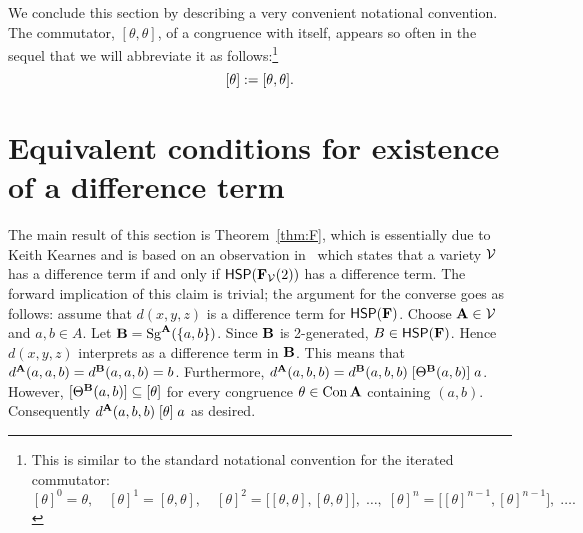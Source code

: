 We conclude this section by describing a very convenient notational convention.
The commutator, $[\theta, \theta]$, of a congruence with
itself, appears so often in the sequel that we will abbreviate it as
follows:\footnote{This is similar to the standard notational convention
  for the iterated commutator:
  \[
    [\theta]^0 =  \theta, \quad
    [\theta]^1 =  [\theta, \theta],  \quad
    [\theta]^2 =  \bigl[[\theta, \theta],[\theta, \theta]\bigr],  \; \dots, \;
    [\theta]^n =  \bigl[[\theta]^{n-1}, [\theta]^{n-1}\bigr], \; \dots.
    \]
}
\[
[\theta]:= [\theta, \theta].
\]



\section{Equivalent conditions for existence of a difference term}
\label{sec:equiv-cond-exist}
The main result of this section is Theorem~\ref{thm:F}, which 
is essentially due to Keith Kearnes and is based on an observation
in~\cite{MR1358491}
which states that a variety $\mathcal{V}$ has a difference term if and only if
$\mathsf{H} \mathsf{S} \mathsf{P}(\mathbf{F}_{\mathcal{V}}(2))$ 
has a difference term.
The forward implication of this claim is trivial;
the argument for the converse goes as follows:
assume that $d(x, y, z)$ is a difference term for $\mathsf{H} \mathsf{S} \mathsf{P}(\mathbf{F})$.
Choose $\mathbf{A} \in \mathcal{V}$ and $a, b \in A$. Let $\mathbf{B} = \operatorname{Sg}^{\mathbf{A}} (\{a, b\})$.
Since $\mathbf{B}$ is 2-generated, $B \in \mathsf{H} \mathsf{S} \mathsf{P} (\mathbf{F})$.
Hence $d(x, y, z)$ interprets as a difference term in $\mathbf{B}$. This means that
$d^{\mathbf{A}} (a, a, b) = d^{\mathbf{B}} (a, a, b) = b$.
Furthermore,
$d^{\mathbf{A}} (a, b, b) = d^{\mathbf{B}} (a, b, b)
\mathrel{[\Theta^{\mathbf{B}} (a, b)]} a$.
However, 
$[\Theta^{\mathbf{B}} (a, b)] \subseteq [\theta]$
for every congruence
$\theta \in \operatorname{Con} \mathbf{A}$ containing $(a, b)$. Consequently
$d^{\mathbf{A}} (a, b, b)
\mathrel{[\theta]}
a$ as desired.


